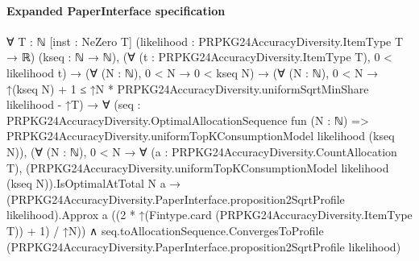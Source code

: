 \documentclass[10pt]{article}
\begin{document}
\paragraph{Expanded PaperInterface specification}
\begin{ReviewVerbatim}
∀ {T : ℕ} [inst : NeZero T] (likelihood : PRPKG24AccuracyDiversity.ItemType T → ℝ) (kseq : ℕ → ℕ),
  (∀ (t : PRPKG24AccuracyDiversity.ItemType T), 0 < likelihood t) →
    (∀ (N : ℕ), 0 < N → 0 < kseq N) →
      (∀ (N : ℕ), 0 < N → ↑(kseq N) + 1 ≤ ↑N * PRPKG24AccuracyDiversity.uniformSqrtMinShare likelihood - ↑T) →
        ∀
          (seq :
            PRPKG24AccuracyDiversity.OptimalAllocationSequence fun (N : ℕ) =>
              PRPKG24AccuracyDiversity.uniformTopKConsumptionModel likelihood (kseq N)),
          (∀ (N : ℕ),
              0 < N →
                ∀ (a : PRPKG24AccuracyDiversity.CountAllocation T),
                  (PRPKG24AccuracyDiversity.uniformTopKConsumptionModel likelihood (kseq N)).IsOptimalAtTotal N a →
                    (PRPKG24AccuracyDiversity.PaperInterface.proposition2SqrtProfile likelihood).Approx a
                      ((2 * ↑(Fintype.card (PRPKG24AccuracyDiversity.ItemType T)) + 1) / ↑N)) ∧
            seq.toAllocationSequence.ConvergesToProfile
              (PRPKG24AccuracyDiversity.PaperInterface.proposition2SqrtProfile likelihood)
\end{ReviewVerbatim}
\end{document}
